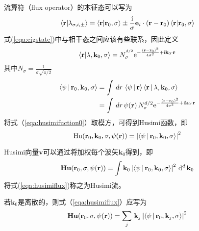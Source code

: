 \documentclass[UTF8]{ctexart}
\begin{document}
流算符（flux operator）的本征态可以写为
\begin{equation}
    \braket{\mathbf{r}\vert\mathbf{\lambda}_{\sigma,i,\pm}}=\braket{\mathbf{r}\vert\mathbf{r}_0,\sigma}\pm\frac{\mathrm{i}}{\sigma}\mathbf{e}_i\cdot(\mathbf{r}-\mathbf{r}_0)\braket{\mathbf{r}\vert\mathbf{r}_0,\sigma}
    \label{eqa:eigstate}
\end{equation}
式(\ref{eqa:eigstate})中与相干态之间应该有些联系，因此定义
\begin{equation}
    \braket{\mathbf{r}|\mathbf{\lambda},\mathbf{k}_0,\sigma}=N^{^{d/2}}_{\sigma}\mathrm{e}^{-\frac{(\mathbf{r}-\mathbf{r}_0)^2}{4\sigma^2}+\mathrm{i}\mathbf{k}_0\cdot\mathbf{r}}
    \label{eqa:newdefine}
\end{equation}
其中$N_\sigma=\frac{1}{\sigma\sqrt{\pi/2}}$
\begin{equation}
    \begin{aligned}
    \Braket{\mathbf{\psi}|\mathbf{r}_0,\mathbf{k}_0,\sigma} &= \int \,dr\,\Braket{\mathbf{\psi}|\mathbf{r}}\Braket{\mathbf{r}|\mathbf{\lambda},\mathbf{k}_0,\sigma}\\
                                                            &= \int \,dr\,\psi(\mathbf{r})\,N_{\sigma}^{d/2}\mathrm{e}^{-\frac{(\mathbf{r}-\mathbf{r}_0)^2}{4\sigma^2}+\mathrm{i}\mathbf{k}_0\cdot\mathbf{r}} 
    \label{eqa:husimifuction0}
    \end{aligned}
\end{equation}
将式（\ref{eqa:husimifuction0}）取模方，可得到Husimi函数，即
\begin{equation}
    \mathrm{Hu}(\mathbf{r}_0,\mathbf{k}_0, \sigma,\psi(\mathbf{r}))=\left\lvert\Braket{\mathbf{\psi}|\mathbf{r}_0,\mathbf{k}_0,\sigma}\right\rvert^2  
    \label{eqa:husimifuction1}
\end{equation}

Husimi向量$\mathbf{v}$可以通过将加权每个波矢$\mathbf{k}_0$得到，即
\begin{equation}
    \mathbf{Hu}(\mathbf{r}_0,\sigma,\psi(\mathbf{r}))=\int \mathbf{k}_0\left\lvert\Braket{\mathbf{\psi}|\mathbf{r}_0,\mathbf{k}_0,\sigma}\right\rvert^2\,\mathrm{d}^d\,\mathbf{k}_0
    \label{eqa:husimiflux}
    \end{equation}
将式(\ref{eqa:husimiflux})称之为Husimi流。

若$\mathbf{k}_0$是离散的，则式（\ref{eqa:husimiflux}）应写为
\begin{equation}
    \mathbf{Hu}(\mathbf{r}_0,\sigma,\psi(\mathbf{r}))= \sum_{j}\,\mathbf{k}_j\left\lvert\Braket{\mathbf{\psi}|\mathbf{r}_0,\mathbf{k}_j,\sigma}\right\rvert^2
    \label{eqa:dishusimiflux}
\end{equation}
\end{document}
